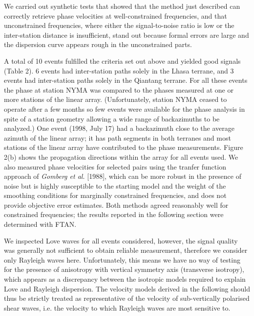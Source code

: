 \documentclass[12pt]{article}
\begin{document}
We carried out synthetic tests that showed that the method just described can correctly retrieve phase 
velocities at well-constrained frequencies, and that unconstrained frequencies, where either the 
signal-to-noise ratio is low or the inter-station distance is insufficient, stand out because formal errors 
are large and the dispersion curve appears rough in the unconstrained parts. 

A total of 10 events fulfilled the criteria set out above and yielded good signals (Table 2).  6 events had 
inter-station paths solely in the Lhasa terrane, and 3 events had inter-station paths solely in the 
Qiantang terrane.  For all these events the phase at station NYMA was compared to the phases measured at 
one or more stations of the linear array. (Unfortunately, station NYMA ceased to operate after a few months 
so few events were available for the phase analysis in spite of a station geometry allowing a wide range of 
backazimuths to be analyzed.)  One event (1998, July 17) had a backazimuth close to the average azimuth of 
the linear array; it has path segments in both terranes and most stations of the linear array have 
contributed to the phase measurements.  Figure 2(b) shows the propagation directions within the array for 
all events used.  We also measured phase velocities for selected pairs using the tranfer function approach 
of {\it Gomberg et al.} [1988], which can be more robust in the presence of noise but is highly susceptible 
to the starting model and the weight of the smoothing conditions for marginally constrained frequencies, and does not provide objective error estimates.  
Both methods agreed reasonably well for constrained frequencies; the results reported in
the following section were determined with FTAN. 

We inspected Love waves for all events considered, however, the signal quality was generally not sufficient 
to obtain reliable measurement, therefore we consider only Rayleigh waves
here. Unfortunately, this means we have no way of testing for the presence
  of anisotropy with vertical symmetry axis (transverse isotropy), which
 appears as a discrepancy between the isotropic models required to explain Love and
 Rayleigh dispersion.  The velocity models derived in the following should thus
 be strictly treated as representative of the velocity of sub-vertically
 polarised shear waves, i.e. the velocity to which Rayleigh waves are most
 sensitive to.
\end{document}
